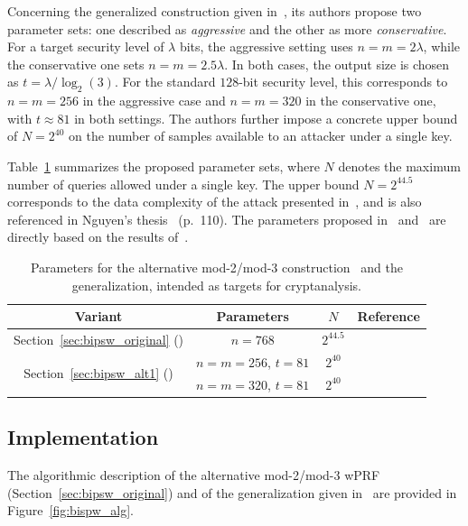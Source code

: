 \documentclass[journal=tosc,submission]{iacrtrans}
\theoremstyle{theorem}
\begin{document}
Concerning the generalized construction given in~\cite{C:DGHIKS21}, its authors propose two parameter sets: one described as \emph{aggressive} and the other as more \emph{conservative}. For a target security level of $\lambda$ bits, the aggressive setting uses $n = m = 2\lambda$, while the conservative one sets $n = m = 2.5\lambda$. In both cases, the output size is chosen as $t = \lambda / \log_2(3)$. For the standard $128$-bit security level, this corresponds to $n = m = 256$ in the aggressive case and $n = m = 320$ in the conservative one, with $t \approx 81$ in both settings. The authors further impose a concrete upper bound of $N = 2^{40}$ on the number of samples available to an attacker under a single key.


Table~\ref{tab:parameters_bipsw} summarizes the proposed parameter sets, where \( N \) denotes the maximum number of queries allowed under a single key. The upper bound \( N = 2^{44.5} \) corresponds to the data complexity of the attack presented in~\cite{JMN23}, and is also referenced in Nguyen’s thesis~\cite{nguyen2025} (p.~110). The parameters proposed in~\cite{AC:CDDKS24} and~\cite{EC:BCMPR24} are directly based on the results of~\cite{JMN23}.



\begin{table}[!ht]
\centering
\begin{tabular}{cccc}
\toprule
Variant & Parameters & $N$ & Reference \\
\midrule
Section~\ref{sec:bipsw_original} (\cite{TCC:BIPSW18}) &$n = 768$& $2^{44.5}$ & \cite{AC:CDDKS24,JMN23,nguyen2025}\\
\midrule
\multirow{2}{*}{Section~\ref{sec:bipsw_alt1} (\cite{C:DGHIKS21})}& $n = m = 256$, $t = 81$ & $2^{40}$ & \multirow{2}{*}{\cite{C:DGHIKS21}}\\
& $n = m = 320$, $t = 81$  & $2^{40}$ & \\
\bottomrule
\end{tabular}
\caption{\label{tab:parameters_bipsw}Parameters for the alternative mod-2/mod-3 construction~\cite{TCC:BIPSW18} and the  \cite{C:DGHIKS21} generalization, intended as targets for cryptanalysis. }
\end{table}

\subsection{Implementation}
The algorithmic description of the alternative mod-2/mod-3 wPRF (Section~\ref{sec:bipsw_original}) and of the generalization given in~\cite{C:DGHIKS21} are provided in Figure~\ref{fig:bispw_alg}.  
\end{document}
